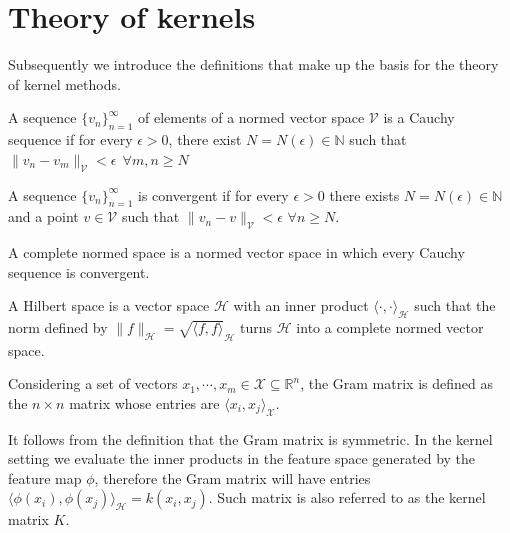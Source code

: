 \section{Theory of kernels}
Subsequently we introduce the definitions that make up the basis for the theory of kernel methods.


\begin{definition}
    A sequence $\{v_n\}_{n=1}^{\infty}$ of elements of a normed vector space $\mathcal{V}$ is a Cauchy sequence if for every $\epsilon>0$, there exist $N=N(\epsilon) \in \mathbb{N}$ such that $\|v_n-v_m\|_{\mathcal{V}}<\epsilon \ \ \forall m,n\geq N$  
\end{definition}

\begin{definition}
    A sequence $\{v_n\}_{n=1}^{\infty}$ is convergent if for every $\epsilon>0$ there exists $N=N(\epsilon) \in \mathbb{N}$ and a point $ v \in \mathcal{V}$ such that  $\|v_n-v\|_{\mathcal{V}} < \epsilon$ $\forall n\geq N$.
\end{definition}

\begin{definition}
    A complete normed space is a normed vector space in which every Cauchy sequence is convergent.
\end{definition}


\begin{definition}
    A Hilbert space is a vector space $\mathcal{H}$ with an inner product $\langle \cdot, \cdot \rangle_{\mathcal{H}}$ such that the norm defined by $\|f\|_{\mathcal{H}}=\sqrt{\langle f, f \rangle}_{\mathcal{H}}$
turns $\mathcal{H}$ into a complete normed vector space.
\end{definition}




\begin{definition}
    Considering a set of vectors $x_1, \cdots, x_m \in \mathcal{X} \subseteq \mathbb{R}^n$, the Gram matrix is defined as the $n\times n$ matrix whose entries are $\langle x_i, x_j \rangle_{\mathcal{X}}$.    
\end{definition}

It follows from the definition that the Gram matrix is symmetric.
In the kernel setting we evaluate the inner products in the feature space generated by the feature map $\phi$, therefore the Gram matrix will have entries $\langle \phi(x_i), \phi(x_j) \rangle_{\mathcal{H}}= k(x_i, x_j)$. Such matrix is also referred to as the kernel matrix $K$.

